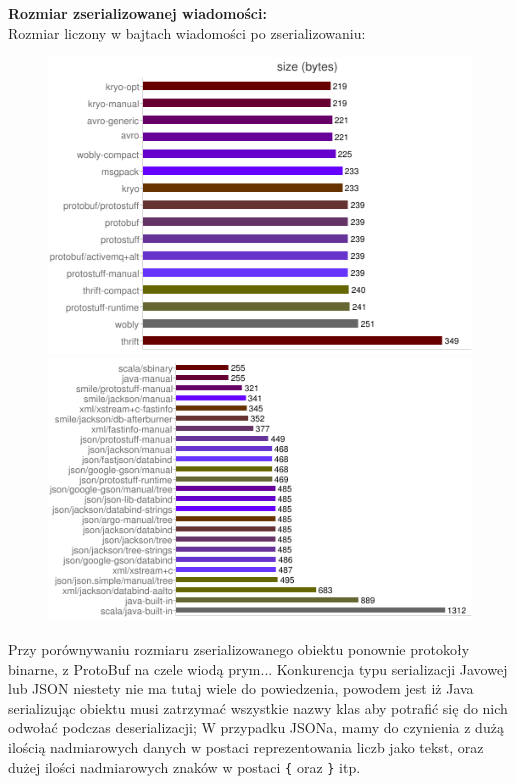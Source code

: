 \newpage
\textbf{Rozmiar zserializowanej wiadomości:}\\
Rozmiar liczony w bajtach wiadomości po zserializowaniu:

\begin{figure}[ch!]
 \includegraphics[scale=0.8]{serialized_size_1}
 \includegraphics[scale=1]{serialized_size_2} 
\end{figure}

Przy porównywaniu rozmiaru zserializowanego obiektu ponownie protokoły binarne, z ProtoBuf na czele wiodą prym... 
Konkurencja typu serializacji Javowej lub JSON niestety nie ma tutaj wiele do powiedzenia, powodem jest iż Java serializując obiektu musi
zatrzymać wszystkie nazwy klas aby potrafić się do nich odwołać podczas deserializacji; W przypadku JSONa, mamy do czynienia z dużą ilością nadmiarowych danych
w postaci reprezentowania liczb jako tekst, oraz dużej ilości nadmiarowych znaków w postaci \verb|{| oraz \verb|}| itp.



